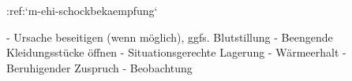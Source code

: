 %
:ref:`m-ehi-schockbekaempfung`
\begin{itemize}
  -   Ursache beseitigen (wenn möglich), ggfs. Blutstillung
  -   Beengende Kleidungsstücke öffnen
  -   Situationsgerechte Lagerung
  -   Wärmeerhalt
  -   Beruhigender Zuspruch
  -   Beobachtung
\end{itemize}